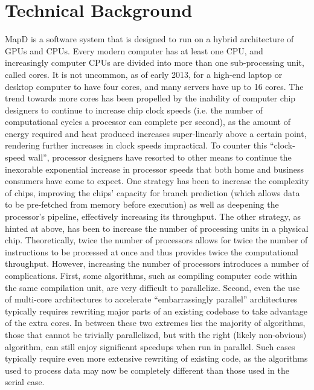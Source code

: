 \documentclass[twocolumn]{article}
\begin{document}
\section{Technical Background}
MapD is a software system that is designed to run on a hybrid architecture of GPUs and CPUs. Every modern computer has at least one CPU, and increasingly computer CPUs are divided into more than one sub-processing unit, called cores. It is not uncommon, as of early 2013, for a high-end laptop or desktop computer to have four cores, and many servers have up to 16 cores. The trend towards more cores has been propelled by the inability of computer chip designers to continue to increase chip clock speeds (i.e. the number of computational cycles a processor can complete per second), as the amount of energy required and heat produced increases super-linearly above a certain point, rendering further increases in clock speeds impractical. To counter this “clock-speed wall”, processor designers have resorted to other means to continue the inexorable exponential increase in processor speeds that both home and business consumers have come to expect. One strategy has been to increase the complexity of chips, improving the chips’ capacity for branch prediction (which allows data to be pre-fetched
from memory before execution) as well as deepening the processor’s pipeline, effectively increasing its throughput.
The other strategy, as hinted at above, has been to increase the number of processing units in a physical chip. Theoretically, twice the number of processors allows for twice the number of instructions to be processed at once and thus provides twice the computational throughput. However, increasing the number of processors introduces a number of complications. First, some algorithms, such as compiling computer code within the same compilation unit, are very difficult to parallelize. Second, even the use of multi-core architectures to accelerate “embarrassingly parallel” architectures typically requires rewriting major parts of an existing codebase to take advantage of the extra cores. In between these two extremes lies the majority of algorithms, those that cannot be trivially parallelized, but with the right (likely non-obvious) algorithm, can still enjoy significant speedups when run in parallel. Such cases typically require even more extensive rewriting of existing code, as the algorithms used to process data may now be completely different than those used in the serial case.
\end{document}
